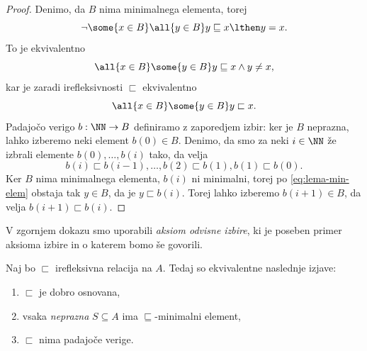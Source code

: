 \begin{proof}
  Denimo, da $B$ nima minimalnega elementa, torej
  \begin{equation*}
    \lnot \some{x \in B} \all{y \in B} y \sqsubseteq x \lthen y = x.
  \end{equation*}
  To je ekvivalentno
  \begin{equation*}
    \all{x \in B} \some{y \in B} y \sqsubseteq x \land y \neq x,
  \end{equation*}
  kar je zaradi irefleksivnosti $\sqsubset$ ekvivalentno
  \begin{equation}
    \label{eq:lema-min-elem}
    \all{x \in B} \some{y \in B} y \sqsubset x.
  \end{equation}
  Padajočo verigo $b : \NN \to B$ definiramo z zaporedjem izbir: ker je $B$ neprazna, lahko izberemo
  neki element $b(0) \in B$. Denimo, da smo za neki $i \in \NN$ že izbrali elemente $b(0), \ldots, b(i)$
  tako, da velja
  \begin{equation*}
    b(i) \sqsubset b(i-1), \ldots, b(2) \sqsubset b(1), b(1) \sqsubset b(0).
  \end{equation*}
  Ker $B$ nima minimalnega elementa, $b(i)$ ni minimalni, torej po \eqref{eq:lema-min-elem} obstaja tak $y \in B$, da je $y \sqsubset b(i)$. Torej lahko izberemo $b(i+1) \in B$, da velja $b(i+1) \sqsubset b(i)$.
\end{proof}

\begin{opomba}
  V zgornjem dokazu smo uporabili \emph{aksiom odvisne izbire}, ki je poseben primer
  aksioma izbire in o katerem bomo še govorili.
\end{opomba}

\begin{izrek}
  \label{izr:dobr-osn-iff}
  Naj bo $\sqsubset$ irefleksivna relacija na $A$. Tedaj so ekvivalentne naslednje izjave:
  \begin{enumerate}
  \item \label{it:dobr-osn-1}%
    $\sqsubset$ je dobro osnovana,
  \item \label{it:dobr-osn-2}%
    vsaka \emph{neprazna} $S \subseteq A$ ima $\sqsubseteq$-minimalni element,
  \item \label{it:dobr-osn-3}%
    $\sqsubset$ nima padajoče verige.
  \end{enumerate}
\end{izrek}

